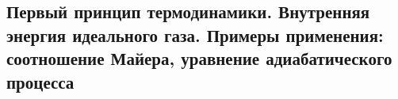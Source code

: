 \subsection{\textbf{Первый принцип термодинамики. Внутренняя энергия идеального газа. Примеры применения: соотношение Майера, уравнение адиабатического процесса}}
